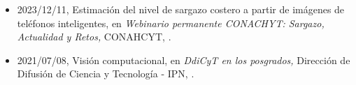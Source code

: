 \begin{itemize} 
\item 2023/12/11, Estimación del nivel de sargazo costero a partir de imágenes de teléfonos inteligentes, en \textit{ Webinario permanente CONACHYT: Sargazo, Actualidad y Retos,} CONAHCYT, \href{https://www.youtube.com/live/yUQVG91bFkw?si=Yl2jPZaK_AEKFwS0}{{\faYoutubePlay}}.
\item 2021/07/08, Visión computacional, en \textit{ DdiCyT en los posgrados,} Dirección de Difusión de Ciencia y Tecnología - IPN, \href{https://youtu.be/ProuWh_Dxxo?si=ncj98MkDQYDJ6wdt}{{\faYoutubePlay}}.
\end{itemize} 
